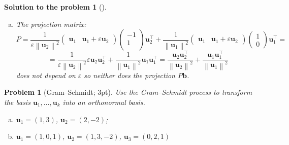 \documentclass[12pt,a4]{article}
\newtheorem{problem}{Problem}
\newtheorem{solution}{Solution to the problem}
\newcommand{\bb}{{\mathbf b}}
\newcommand{\bu}{{\mathbf u}}
\newcommand{\bx}{{\mathbf x}}
\newcommand{\norm}[1]{\left\lVert#1\right\rVert}
\begin{document}
\begin{solution}[]
\begin{enumerate}[(a)]
\item
The projection matrix:
\[
P
=
\frac{1}{\varepsilon\norm{\bu_2}^2}
\begin{pmatrix} 
\bu_1 & \bu_1+\varepsilon\bu_2
\end{pmatrix}
\begin{pmatrix} 
 - 1 \\
 1 \\
\end{pmatrix}
\bu_2^\top
+
\frac{1}{\norm{\bu_1}^2}
\begin{pmatrix} 
\bu_1 & \bu_1+\varepsilon\bu_2
\end{pmatrix}
\begin{pmatrix} 
1 \\ 0
\end{pmatrix}
\bu_1^\top
=
\]
\[
=
\frac{1}{\varepsilon\norm{\bu_2}^2}
\varepsilon\bu_2
\bu_2^\top
+
\frac{1}{\norm{\bu_1}^2}
\bu_1
\bu_1^\top
=
\frac{\bu_2\bu_2^\top}{\norm{\bu_2}^2}
+
\frac{\bu_1\bu_1^\top}{\norm{\bu_1}^2}
\]
does not depend on $\varepsilon$ so neither does the projection $P\bb$.\\
\end{enumerate}
\end{solution}


\begin{problem}[Gram--Schmidt; 3pt]\rm
	Use the Gram--Schmidt process to transform the basis $\bu_1,\dots,\bu_k$ into
	an orthonormal basis.
	\begin{enumerate}[(a)]
		\item $\bu_1=(1,3)$, $\bu_2=(2,-2)$;
		\item $\bu_1=(1,0,1)$, $\bu_2 = (1,3,-2)$, $\bu_3=(0,2,1)$
	\end{enumerate}
\end{problem}
\end{document}
